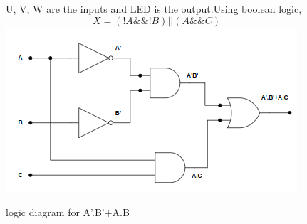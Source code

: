\documentclass{article}
\begin{document}
\begin{figure}
\begin{multicols}{2}
U, V, W are the
inputs and LED is the output.Using boolean
logic,
\begin{equation}
X=(!A\&\&!B)||(A\&\&C) 
\end{equation} 
    \centering
    \includegraphics[width=\columnwidth]{assignment 2.png}
    \caption{logic diagram for A'.B'+A.B}    
\end{multicols}{}
\end{figure}
\end{document}
